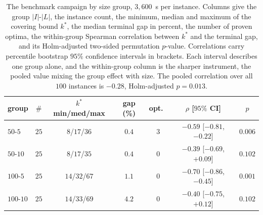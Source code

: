 \begin{table}[H]
\centering
\caption{The benchmark campaign by size group, $3{,}600$~s per instance.
Columns give the group $|I|$-$|L|$, the instance count, the minimum,
median and maximum of the covering bound $k^\ast$, the median terminal
gap in percent, the number of proven optima, the within-group Spearman
correlation between $k^\ast$ and the terminal gap, and its
Holm-adjusted two-sided permutation $p$-value. Correlations carry
percentile bootstrap $95\%$ confidence intervals in brackets. Each
interval describes one group alone, and the within-group column is the
sharper instrument, the pooled value mixing the group effect with size.
The pooled correlation over all $100$ instances is $-0.28$,
Holm-adjusted $p=0.013$.}
\label{tab:q3groups}
\small
\setlength{\tabcolsep}{4pt}
\begin{tabular}{lcccccc}
\hline
group & $\#$ & $k^\ast$ min/med/max & gap (\%) & opt.\ &
$\rho$ [$95\%$ CI] & $p$ \\
\hline
$50$-$5$ & $25$ & $8$/$17$/$36$ & $0.4$ & $3$ & $-0.59$ [$-0.81$, $-0.22$] & $0.006$ \\
$50$-$10$ & $25$ & $8$/$17$/$35$ & $0.4$ & $0$ & $-0.39$ [$-0.69$, $+0.09$] & $0.102$ \\
$100$-$5$ & $25$ & $14$/$32$/$67$ & $1.1$ & $0$ & $-0.70$ [$-0.86$, $-0.45$] & $0.001$ \\
$100$-$10$ & $25$ & $14$/$33$/$69$ & $4.2$ & $0$ & $-0.40$ [$-0.75$, $+0.12$] & $0.102$ \\
\hline
\end{tabular}
\end{table}
